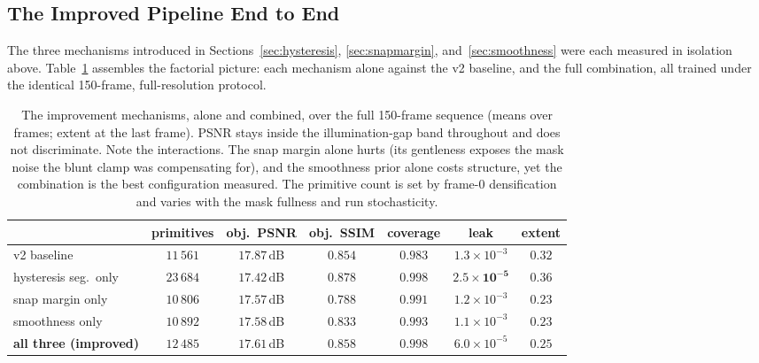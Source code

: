 \subsection{The Improved Pipeline End to End}
\label{sec:results-improved}

The three mechanisms introduced in Sections~\ref{sec:hysteresis},
\ref{sec:snapmargin}, and~\ref{sec:smoothness} were each measured in isolation above.
Table~\ref{tab:improved} assembles the factorial picture: each mechanism alone against
the v2 baseline, and the full combination, all trained under the identical
150-frame, full-resolution protocol.

\begin{table}[!ht]
    \centering
    \setlength{\tabcolsep}{4pt}
    \begin{tabular}{lcccccc}
        \toprule
        & primitives & obj.\ PSNR & obj.\ SSIM & coverage & leak & extent \\
        \midrule
        v2 baseline                   & $11\,561$ & $17.87$\,dB & $0.854$ & $0.983$ & $1.3\times10^{-3}$ & $0.32$ \\
        \midrule
        hysteresis seg.\ only         & $23\,684$ & $17.42$\,dB & $0.878$ & $0.998$ & $\mathbf{2.5\times10^{-5}}$ & $0.36$ \\
        snap margin only              & $10\,806$ & $17.57$\,dB & $0.788$ & $0.991$ & $1.2\times10^{-3}$ & $0.23$ \\
        smoothness only               & $10\,892$ & $17.58$\,dB & $0.833$ & $0.993$ & $1.1\times10^{-3}$ & $\mathbf{0.23}$ \\
        \midrule
        \textbf{all three (improved)} & $12\,485$ & $17.61$\,dB & $\mathbf{0.858}$ & $\mathbf{0.998}$ & $6.0\times10^{-5}$ & $0.25$ \\
        \bottomrule
    \end{tabular}
    \caption{The improvement mechanisms, alone and combined, over the full
    150-frame
    sequence (means over frames; extent at the last frame). PSNR stays inside the
    illumination-gap band throughout and does not discriminate. Note the
    interactions. The snap margin alone hurts (its gentleness exposes the mask
    noise the blunt clamp was compensating for), and the smoothness prior alone costs
    structure, yet the combination is the best configuration measured. The primitive
    count is set by frame-0 densification and varies with the mask fullness and run
    stochasticity.}
    \label{tab:improved}
\end{table}

